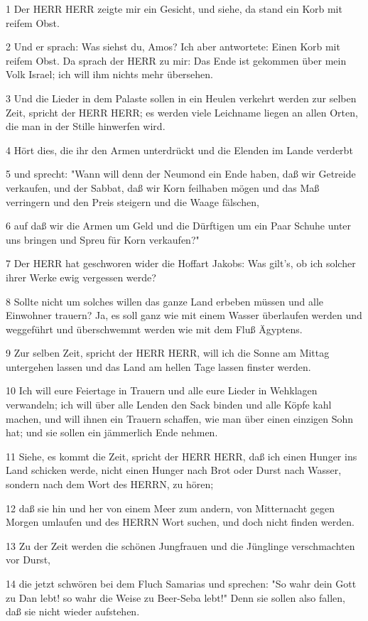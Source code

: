 \par 1 Der HERR HERR zeigte mir ein Gesicht, und siehe, da stand ein Korb mit reifem Obst.
\par 2 Und er sprach: Was siehst du, Amos? Ich aber antwortete: Einen Korb mit reifem Obst. Da sprach der HERR zu mir: Das Ende ist gekommen über mein Volk Israel; ich will ihm nichts mehr übersehen.
\par 3 Und die Lieder in dem Palaste sollen in ein Heulen verkehrt werden zur selben Zeit, spricht der HERR HERR; es werden viele Leichname liegen an allen Orten, die man in der Stille hinwerfen wird.
\par 4 Hört dies, die ihr den Armen unterdrückt und die Elenden im Lande verderbt
\par 5 und sprecht: "Wann will denn der Neumond ein Ende haben, daß wir Getreide verkaufen, und der Sabbat, daß wir Korn feilhaben mögen und das Maß verringern und den Preis steigern und die Waage fälschen,
\par 6 auf daß wir die Armen um Geld und die Dürftigen um ein Paar Schuhe unter uns bringen und Spreu für Korn verkaufen?"
\par 7 Der HERR hat geschworen wider die Hoffart Jakobs: Was gilt's, ob ich solcher ihrer Werke ewig vergessen werde?
\par 8 Sollte nicht um solches willen das ganze Land erbeben müssen und alle Einwohner trauern? Ja, es soll ganz wie mit einem Wasser überlaufen werden und weggeführt und überschwemmt werden wie mit dem Fluß Ägyptens.
\par 9 Zur selben Zeit, spricht der HERR HERR, will ich die Sonne am Mittag untergehen lassen und das Land am hellen Tage lassen finster werden.
\par 10 Ich will eure Feiertage in Trauern und alle eure Lieder in Wehklagen verwandeln; ich will über alle Lenden den Sack binden und alle Köpfe kahl machen, und will ihnen ein Trauern schaffen, wie man über einen einzigen Sohn hat; und sie sollen ein jämmerlich Ende nehmen.
\par 11 Siehe, es kommt die Zeit, spricht der HERR HERR, daß ich einen Hunger ins Land schicken werde, nicht einen Hunger nach Brot oder Durst nach Wasser, sondern nach dem Wort des HERRN, zu hören;
\par 12 daß sie hin und her von einem Meer zum andern, von Mitternacht gegen Morgen umlaufen und des HERRN Wort suchen, und doch nicht finden werden.
\par 13 Zu der Zeit werden die schönen Jungfrauen und die Jünglinge verschmachten vor Durst,
\par 14 die jetzt schwören bei dem Fluch Samarias und sprechen: "So wahr dein Gott zu Dan lebt! so wahr die Weise zu Beer-Seba lebt!" Denn sie sollen also fallen, daß sie nicht wieder aufstehen.

